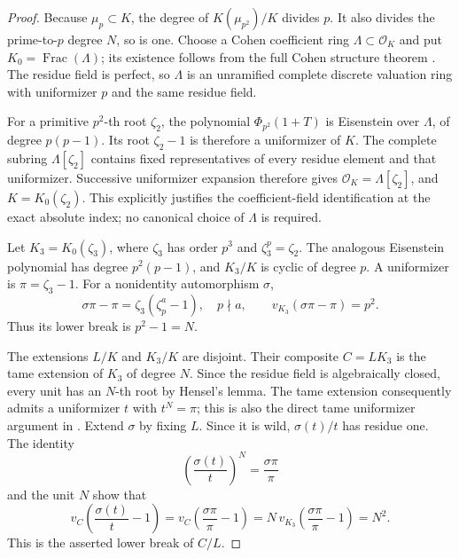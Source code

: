 \begin{proof}
Because \(\mu_p\subset K\), the degree of
\(K(\mu_{p^2})/K\) divides \(p\). It also divides
the prime-to-\(p\) degree \(N\), so is one.
Choose a Cohen coefficient ring \(\Lambda\subset\mathcal O_K\)
and put \(K_0=\operatorname{Frac}(\Lambda)\);
its existence follows from the full Cohen structure
theorem \cite[Tag 032A]{Stacks032A}.
The residue field is perfect, so \(\Lambda\) is an
unramified complete discrete valuation ring with
uniformizer \(p\) and the same residue field.

For a primitive \(p^2\)-th root \(\zeta_2\), the
polynomial \(\Phi_{p^2}(1+T)\) is Eisenstein over
\(\Lambda\), of degree \(p(p-1)\). Its root
\(\zeta_2-1\) is therefore a uniformizer of \(K\).
The complete subring \(\Lambda[\zeta_2]\) contains
fixed representatives of every residue element and
that uniformizer. Successive uniformizer expansion
therefore gives \(\mathcal O_K=\Lambda[\zeta_2]\),
and \(K=K_0(\zeta_2)\). This explicitly justifies
the coefficient-field identification at the exact
absolute index; no canonical choice of \(\Lambda\)
is required.

Let \(K_3=K_0(\zeta_3)\), where \(\zeta_3\) has
order \(p^3\) and \(\zeta_3^p=\zeta_2\).
The analogous Eisenstein polynomial has degree
\(p^2(p-1)\), and \(K_3/K\) is cyclic of degree
\(p\). A uniformizer is \(\pi=\zeta_3-1\).
For a nonidentity automorphism \(\sigma\),
\[
   \sigma\pi-\pi=\zeta_3(\zeta_p^a-1),\quad
   p\nmid a,\qquad v_{K_3}(\sigma\pi-\pi)=p^2.
                                                        \tag{B-RD86.1}
\]
Thus its lower break is \(p^2-1=N\).

The extensions \(L/K\) and \(K_3/K\) are disjoint.
Their composite \(C=LK_3\) is the tame extension of
\(K_3\) of degree \(N\). Since the residue field is
algebraically closed, every unit has an \(N\)-th root
by Hensel's lemma. The tame extension consequently
admits a uniformizer \(t\) with \(t^N=\pi\);
this is also the direct tame uniformizer argument in
\cite[Proposition 2.12 and proof, p.~11]{ColmezCorpsLocaux}.
Extend \(\sigma\) by fixing \(L\). Since it is wild,
\(\sigma(t)/t\) has residue one. The identity
\[
       \left(\frac{\sigma(t)}t\right)^N
           =\frac{\sigma\pi}{\pi}
                                                        \tag{B-RD86.2}
\]
and the unit \(N\) show that
\[
  v_C\left(\frac{\sigma(t)}t-1\right)
   =v_C\left(\frac{\sigma\pi}{\pi}-1\right)
   =N\,v_{K_3}\left(\frac{\sigma\pi}{\pi}-1\right)
   =N^2.                                               \tag{B-RD86.3}
\]
This is the asserted lower break of \(C/L\).
\end{proof}

